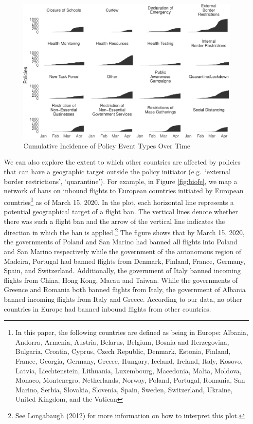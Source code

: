 \documentclass[]{article}
\let\rmarkdownfootnote\footnote%
\def\footnote{\protect\rmarkdownfootnote}
\begin{document}
\begin{figure}
\centering
\includegraphics{corona_wp_files/figure-latex/overtime-1.pdf}
\caption{\label{fig:overtime}Cumulative Incidence of Policy Event Types Over Time}
\end{figure}

We can also explore the extent to which other countries are affected by policies that can have a geographic target outside the policy initiator (e.g.~`external border restrictions', `quarantine'). For example, in Figure \ref{fig:biofe}, we map a network of bans on inbound flights to European countries initiated by European countries\footnote{In this paper, the following countries are defined as being in Europe: Albania, Andorra, Armenia, Austria, Belarus, Belgium, Bosnia and Herzegovina, Bulgaria, Croatia, Cyprus, Czech Republic, Denmark, Estonia, Finland, France, Georgia, Germany, Greece, Hungary, Iceland, Ireland, Italy, Kosovo, Latvia, Liechtenstein, Lithuania, Luxembourg, Macedonia, Malta, Moldova, Monaco, Montenegro, Netherlands, Norway, Poland, Portugal, Romania, San Marino, Serbia, Slovakia, Slovenia, Spain, Sweden, Switzerland, Ukraine, United Kingdom, and the Vatican} as of March 15, 2020. In the plot, each horizontal line represents a potential geographical target of a flight ban. The vertical lines denote whether there was such a flight ban and the arrow of the vertical line indicates the direction in which the ban is applied.\footnote{See Longabaugh (2012) for more information on how to interpret this plot.} The figure shows that by March 15, 2020, the governments of Poland and San Marino had banned all flights into Poland and San Marino respectively while the government of the autonomous region of Madeira, Portugal had banned flights from Denmark, Finland, France, Germany, Spain, and Switzerland. Additionally, the government of Italy banned incoming flights from China, Hong Kong, Macau and Taiwan. While the governments of Greence and Romania both banned flights from Italy, the government of Albania banned incoming flights from Italy and Greece. According to our data, no other countries in Europe had banned inbound flights from other countries.
\end{document}

